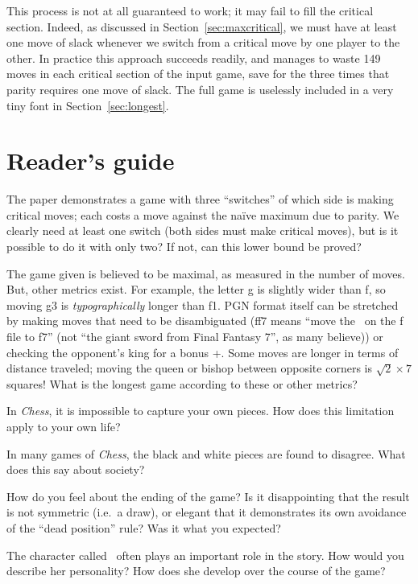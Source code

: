 \documentclass[twocolumn]{article}
\newcommand{\Bishop}[1][1.79ex]{%
\adjustbox{Trim=2.3pt 2pt 2.3pt 0pt,width=#1,raise=-0.12ex,margin=0.1ex 0ex 0.1ex 0ex}{\BlackBishopOnWhite}%
}%
\newcommand{\Queen}[1][2.05ex]{%
\adjustbox{Trim=1.2pt 2.2pt 1.2pt 0pt,width=#1,raise=-0.08ex,margin=0.1ex 0ex 0.1ex 0ex}{\BlackQueenOnWhite}%
}%
\begin{document}
This process is not at all guaranteed to work; it may fail to fill the
critical section. Indeed, as discussed in
Section~\ref{sec:maxcritical}, we must have at least one move of slack
whenever we switch from a critical move by one player to the other.
In practice this approach succeeds readily, and manages to waste 149
moves in each critical section of the input game, save for the three
times that parity requires one move of slack. The full game is uselessly
included in a very tiny font in Section~\ref{sec:longest}.

\section{Reader's guide}

The paper demonstrates a game with three ``switches'' of which side is
making critical moves; each costs a move against the na\"ive maximum
due to parity. We clearly need at least one switch (both sides must
make critical moves), but is it possible to do it with only two? If
not, can this lower bound be proved?

\smallskip
The game given is believed to be maximal, as measured in the number of
moves. But, other metrics exist. For example, the letter g is slightly
wider than f, so moving \Queen g3 is {\em typographically} longer than
\Bishop f1. PGN format itself can be stretched by making moves that
need to be disambiguated (\bishop ff7 means ``move the \bishop\ on the
f file to f7'' (not ``the giant sword from Final Fantasy 7'', as many
believe)) or checking the opponent's king for a bonus +. Some moves
are longer in terms of distance traveled; moving the queen or bishop
between opposite corners is $\sqrt{2} \times 7$ squares! What is the
longest game according to these or other metrics?

\smallskip
In {\it Chess}, it is impossible to capture your own pieces. How does
this limitation apply to your own life?

\smallskip
In many games of {\it Chess}, the black and white pieces are found to
disagree. What does this say about society?

\smallskip
How do you feel about the ending of the game? Is it disappointing that
the result is not symmetric (i.e.~a draw), or elegant that it
demonstrates its own avoidance of the ``dead position'' rule? Was it
what you expected?

\smallskip
The character called \queen\ often plays an important role in the story.
How would you describe her personality? How does she develop over the
course of the game?
\end{document}
